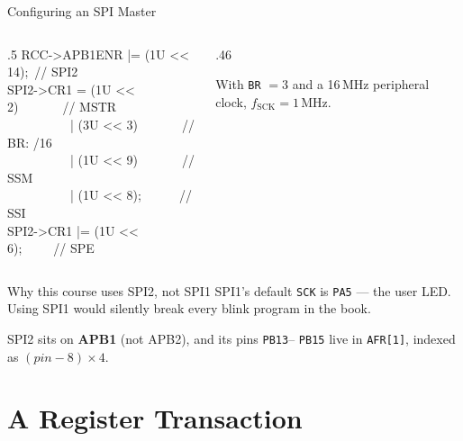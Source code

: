 \documentclass[9pt,aspectratio=169,xcolor=table]{beamer}
\begin{document}
\begin{frame}{Configuring an SPI Master}
    \begin{columns}[T]
    \begin{column}{.5\textwidth}
        {\ttfamily\scriptsize
        RCC->APB1ENR |= (1U << 14);~// SPI2 \\[1mm]
        SPI2->CR1 = (1U << 2)~~~~~~~// MSTR \\
        ~~~~~~~~~~| (3U << 3)~~~~~~~// BR: /16 \\
        ~~~~~~~~~~| (1U << 9)~~~~~~~// SSM \\
        ~~~~~~~~~~| (1U << 8);~~~~~~// SSI \\
        SPI2->CR1 |= (1U << 6);~~~~~// SPE}
    \end{column}
    \begin{column}{.46\textwidth}
        \begin{center}
        \end{center}

        \vspace{2mm}
        {\small With \texttt{BR} $=3$ and a 16\,MHz peripheral clock,
        $f_{\text{SCK}} = 1$\,MHz.}
    \end{column}
    \end{columns}

    \vspace{3mm}
    \begin{block}{Why this course uses SPI2, not SPI1}
        SPI1's default \texttt{SCK} is \alert{\texttt{PA5}} --- the user LED. Using
        SPI1 would silently break every blink program in the book.

        \vspace{1mm}
        SPI2 sits on \textbf{APB1} (not APB2), and its pins \texttt{PB13}--%
        \texttt{PB15} live in \texttt{AFR[1]}, indexed as $(pin-8) \times 4$.
    \end{block}
\end{frame}


\section{A Register Transaction}
\end{document}
